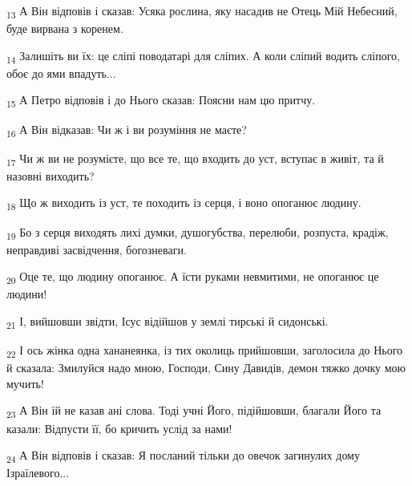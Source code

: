 \begin{tcolorbox}
\textsubscript{13} А Він відповів і сказав: Усяка рослина, яку насадив не Отець Мій Небесний, буде вирвана з коренем.
\end{tcolorbox}
\begin{tcolorbox}
\textsubscript{14} Залишіть ви їх: це сліпі поводатарі для сліпих. А коли сліпий водить сліпого, обоє до ями впадуть...
\end{tcolorbox}
\begin{tcolorbox}
\textsubscript{15} А Петро відповів і до Нього сказав: Поясни нам цю притчу.
\end{tcolorbox}
\begin{tcolorbox}
\textsubscript{16} А Він відказав: Чи ж і ви розуміння не маєте?
\end{tcolorbox}
\begin{tcolorbox}
\textsubscript{17} Чи ж ви не розумієте, що все те, що входить до уст, вступає в живіт, та й назовні виходить?
\end{tcolorbox}
\begin{tcolorbox}
\textsubscript{18} Що ж виходить із уст, те походить із серця, і воно опоганює людину.
\end{tcolorbox}
\begin{tcolorbox}
\textsubscript{19} Бо з серця виходять лихі думки, душогубства, перелюби, розпуста, крадіж, неправдиві засвідчення, богозневаги.
\end{tcolorbox}
\begin{tcolorbox}
\textsubscript{20} Оце те, що людину опоганює. А їсти руками невмитими, не опоганює це людини!
\end{tcolorbox}
\begin{tcolorbox}
\textsubscript{21} І, вийшовши звідти, Ісус відійшов у землі тирські й сидонські.
\end{tcolorbox}
\begin{tcolorbox}
\textsubscript{22} І ось жінка одна хананеянка, із тих околиць прийшовши, заголосила до Нього й сказала: Змилуйся надо мною, Господи, Сину Давидів, демон тяжко дочку мою мучить!
\end{tcolorbox}
\begin{tcolorbox}
\textsubscript{23} А Він їй не казав ані слова. Тоді учні Його, підійшовши, благали Його та казали: Відпусти її, бо кричить услід за нами!
\end{tcolorbox}
\begin{tcolorbox}
\textsubscript{24} А Він відповів і сказав: Я посланий тільки до овечок загинулих дому Ізраїлевого...
\end{tcolorbox}
